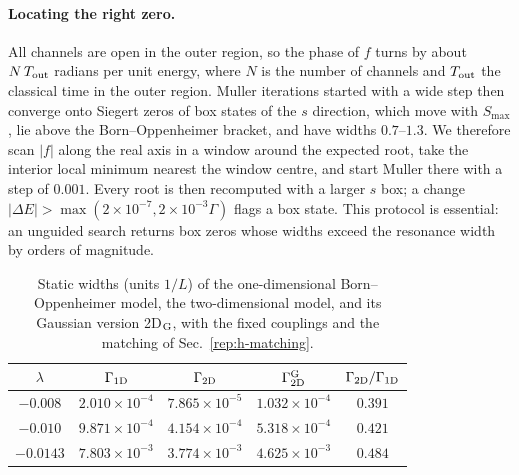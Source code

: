 \paragraph{Locating the right zero.}
All channels are open in the outer region, so the phase of $f$ turns by about $N\,T_{\rm out}$ radians per unit energy, where $N$ is the number of channels and $T_{\rm out}$ the classical time in the outer region.
Muller iterations started with a wide step then converge onto Siegert zeros of box states of the $s$ direction, which move with $S_{\max}$, lie above the Born--Oppenheimer bracket, and have widths $0.7$--$1.3$. %
We therefore scan $|f|$ along the real axis in a window around the expected root, take the interior local minimum nearest the window centre, and start Muller there with a step of $0.001$. %
Every root is then recomputed with a larger $s$ box; a change $|\Delta E|>\max(2\times10^{-7},2\times10^{-3}\Gamma)$ flags a box state. %
This protocol is essential: an unguided search returns box zeros whose widths exceed the resonance width by orders of magnitude.

\begin{table}[t]
\centering
\caption{Static widths (units $1/L$) of the one-dimensional Born--Oppenheimer model, the two-dimensional model, and its Gaussian version 2D$_{\rm G}$, with the fixed couplings and the matching of Sec.~\ref{rep:h-matching}.} %
\label{tab:rb-widths}
\begin{tabular}{ccccc}
\toprule
$\lambda$ & $\Gamma_{\rm 1D}$ & $\Gamma_{\rm 2D}$ & $\Gamma_{\rm 2D}^{\rm G}$ & $\Gamma_{\rm 2D}/\Gamma_{\rm 1D}$ \\
\midrule
$-0.008$ & $2.010\times10^{-4}$ & $7.865\times10^{-5}$ & $1.032\times10^{-4}$ & $0.391$ \\ %
$-0.010$ & $9.871\times10^{-4}$ & $4.154\times10^{-4}$ & $5.318\times10^{-4}$ & $0.421$ \\ %
$-0.0143$ & $7.803\times10^{-3}$ & $3.774\times10^{-3}$ & $4.625\times10^{-3}$ & $0.484$ \\ %
\bottomrule
\end{tabular}
\end{table}

